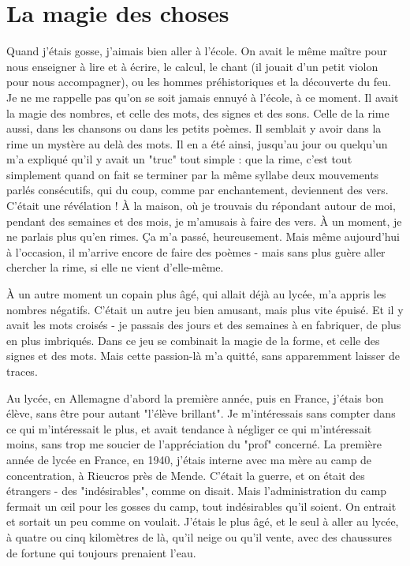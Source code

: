 \section{La magie des choses}

Quand j’étais gosse, j’aimais bien aller à l’école. On avait le même maître pour nous enseigner à lire et à écrire, le calcul, le chant (il jouait d’un petit violon pour nous accompagner), ou les hommes préhistoriques et la découverte du feu. Je ne me rappelle pas qu’on se soit jamais ennuyé à l’école, à ce moment. Il avait la magie des nombres, et celle des mots, des signes et des sons. Celle de la rime aussi, dans les chansons ou dans les petits poèmes. Il semblait y avoir dans la rime un mystère au delà des mots. Il en a été ainsi, jusqu’au jour ou quelqu’un m’a expliqué qu’il y avait un "truc" tout simple : que la rime, c’est tout simplement quand on fait se terminer par la même syllabe deux mouvements parlés consécutifs, qui du coup, comme par enchantement, deviennent des vers. C’était une révélation ! À la maison, où je trouvais du répondant autour de moi, pendant des semaines et des mois, je m’amusais à faire des vers. À un moment, je ne parlais plus qu’en rimes. Ça m’a passé, heureusement. Mais même aujourd’hui à l’occasion, il m’arrive encore de faire des poèmes - mais sans plus guère aller chercher la rime, si elle ne vient d’elle-même.

À un autre moment un copain plus âgé, qui allait déjà au lycée, m’a appris les nombres négatifs. C’était un autre jeu bien amusant, mais plus vite épuisé. Et il y avait les mots croisés - je passais des jours et des semaines à en fabriquer, de plus en plus imbriqués. Dans ce jeu se combinait la magie de la forme, et celle des signes et des mots. Mais cette passion-là m’a quitté, sans apparemment laisser de traces.

Au lycée, en Allemagne d’abord la première année, puis en France, j’étais bon élève, sans être pour autant "l’élève brillant". Je m’intéressais sans compter dans ce qui m’intéressait le plus, et avait tendance à négliger ce qui m’intéressait moins, sans trop me soucier de l’appréciation du "prof" concerné. La première année de lycée en France, en 1940, j’étais interne avec ma mère au camp de concentration, à Rieucros près de Mende. C’était la guerre, et on était des étrangers - des "indésirables", comme on disait. Mais l’administration du camp fermait un œil pour les gosses du camp, tout indésirables qu’il soient. On entrait et sortait un peu comme on voulait. J’étais le plus âgé, et le seul à aller au lycée, à quatre ou cinq kilomètres de là, qu’il neige ou qu’il vente, avec des chaussures de fortune qui toujours prenaient l’eau.


